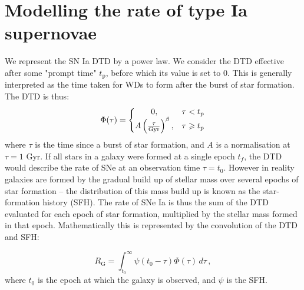 \documentclass[fleqn,usenatbib]{mnras}
\begin{document}
\section{Modelling the rate of type Ia supernovae}
 \label{sec:method}
We represent the SN Ia DTD by a power law. We consider the DTD effective after some "prompt time" $t_{\mathrm{p}}$, before which its value is set to 0. This is generally interpreted as the time taken for WDs to form after the burst of star formation. The DTD is thus:
\begin{equation}
 \Phi(\tau) = \left\{
    \begin{array}{@{}cc@{}}
    0 , & \tau < t_{\mathrm{p}} \\
    A\left(\frac{\tau}{\mathrm{Gyr}}\right)^{\beta} , & \tau \geq t_{\mathrm{p}}
    \end{array}\right.
        \label{eq:dtd}
\end{equation} 
where $\tau$ is the time since a burst of star formation, and $A$ is a normalisation at $\tau=1$ Gyr. If all stars in a galaxy were formed at a single epoch $t_f$, the DTD would describe the rate of SNe at an observation time $\tau = t_0$. However in reality galaxies are formed by the gradual build up of stellar mass over several epochs of star formation -- the distribution of this mass build up is known as the star-formation history (SFH). The rate of SNe Ia is thus the sum of the DTD evaluated for each epoch of star formation, multiplied by the stellar mass formed in that epoch. Mathematically this is represented by the convolution of the DTD and SFH:
 
\begin{equation}
    R_{\mathrm{G}} = \int_{t_0}^{\infty} \psi(t_0-\tau)\Phi(\tau)\,d\tau \,,
    \label{eq:galaxy_rate}
\end{equation}
where $t_0$ is the epoch at which the galaxy is observed, and $\psi$ is the SFH. 
\end{document}
